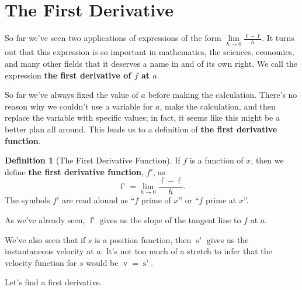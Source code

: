 \documentclass[12pt,]{book}
\newcommand{\terminology}[1]{\textbf{#1}}
\theoremstyle{plain}
\theoremstyle{definition}
\newtheorem{definition}[theorem]{Definition}
\numberwithin{equation}{section}
\newcommand{\fe}[2]{\mathop{{#1}{\left(#2\right)}}}
\newcommand{\fd}[1]{#1'}
\begin{document}
\section[The First Derivative]{The First Derivative}\label{section-first-derivative}
So far we've seen two applications of expressions of the form \(\lim\limits_{h\to0}\frac{\fe{f}{a+h}-\fe{f}{a}}{h}\). It turns out that this expression is so important in mathematics, the sciences, economics, and many other fields that it deserves a name in and of its own right. We call the expression \terminology{the first derivative of \(f\) at \(a\)}.%
\par
So far we've always fixed the value of \(a\) before making the calculation. There's no reason why we couldn't use a variable for \(a\), make the calculation, and then replace the variable with specific values; in fact, it seems like this might be a better plan all around. This leads us to a definition of \terminology{the first derivative function}.%
\begin{definition}[The First Derivative Function]\label{definition-first-derivative}
If \(f\) is a function of \(x\), then we define \terminology{the first derivative function}, \(\fd{f}\), as \[\fe{\fd{f}}{x}=\lim_{h\to0}\frac{\fe{f}{x+h}-\fe{f}{x}}{h}\text{.}\] The symbols \(\fd{f}\) are read alound as ``\(f\) prime of \(x\)'' or ``\(f\) prime at \(x\)''.%
\end{definition}
\par
As we've already seen, \(\fe{\fd{f}}{a}\) gives us the slope of the tangent line to \(f\) at \(a\).%
\par
We've also seen that if \(s\) is a position function, then \(\fe{\fd{s}}{a}\) gives us the instantaneous velocity at \(a\). It's not too much of a stretch to infer that the velocity function for \(s\) would be \(\fe{v}{t}=\fe{\fd{s}}{t}\).%
\par
Let's find a first derivative.%
\end{document}
